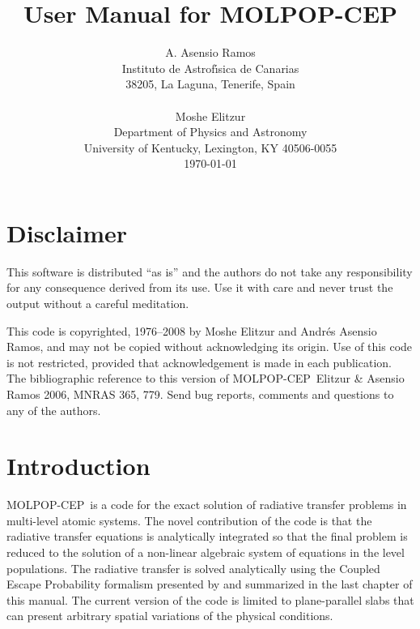 \documentclass[12pt]{article}
\def\M{MOLPOP-CEP}
\begin{document}
\title                  {\sc User Manual for \M}

\author{ A. Asensio Ramos \\
         Instituto de Astrof\'{\i}sica de Canarias\\
         38205, La Laguna, Tenerife, Spain\\ \\
        Moshe Elitzur \\
        Department of Physics and Astronomy \\
        University of Kentucky, Lexington, KY 40506-0055
        \\[0.5in] \today}%
\date{}
\maketitle


\tableofcontents

\newpage

\section*{Disclaimer}

This software is distributed ``as is'' and the authors do not take any
responsibility for any consequence derived from its use. Use it with care and
never trust the output without a careful meditation. 

This code is copyrighted,
1976--2008 by Moshe Elitzur and Andr\'es Asensio Ramos, and may not be copied
without acknowledging its origin. Use of this code is not restricted, provided
that acknowledgement is made in each publication. The bibliographic reference
to this version of \M\ Elitzur \& Asensio Ramos 2006, MNRAS 365, 779. Send bug
reports, comments and questions to any of the authors.


\newpage

\section{Introduction}

\M\ is a code for the exact solution of radiative transfer problems in
multi-level atomic systems. The novel contribution of the code is that the
radiative transfer equations is analytically integrated so that the final
problem is reduced to the solution of a non-linear algebraic system of
equations in the level populations. The radiative transfer is solved
analytically using the Coupled Escape Probability formalism presented by
\cite{elitzur_asensio_cep06} and summarized in the last chapter of this manual.
The current version of the code is limited to plane-parallel slabs that can
present arbitrary spatial variations of the physical conditions.
\end{document}
